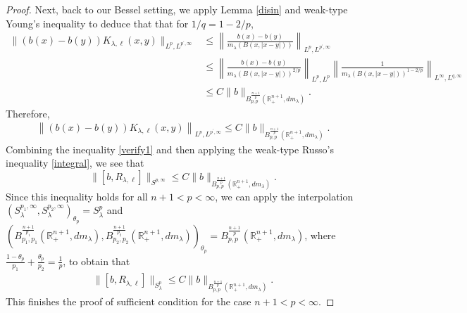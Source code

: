 \documentclass[12pt]{amsart}
\begin{document}
\begin{proof}
Next, back to our Bessel setting, we apply Lemma \ref{disin} and weak-type Young's inequality to deduce that that for $1/q=1-2/p$,
\begin{align*}
\|(b(x)-b(y))K_{\lambda,\ell}(x,y)\|_{L^p,L^{p^{\prime},\infty}}&\leq
\left\|\frac{b(x)-b(y)}{m_\lambda(B(x,|x-y|))}\right\|_{L^p, L^{p^{\prime},\infty}}\nonumber\\
&\leq \left\|\frac{b(x)-b(y)}{m_\lambda(B(x,|x-y|))^{2/p}}\right\|_{L^{p},L^{p}}\left\|\frac{1}{m_\lambda(B(x,|x-y|))^{1-2/p}}\right\|_{L^{\infty},L^{q,\infty}}\nonumber\\
&\leq C\|b\|_{B_{p,p}^{\frac{n+1}{p}}(\mathbb R_+^{n+1},dm_\lambda)}.
\end{align*}
%
%
Therefore,
\begin{align}\label{verify1}
\left\|(b(x)-b(y))K_{\lambda,\ell}(x,y)\right\|_{L^p, L^{p^{\prime},\infty}}\leq C\|b\|_{B_{p,p}^{\frac{n+1}{p}}(\mathbb R_+^{n+1},dm_\lambda)}.
\end{align}
Combining the inequality \eqref{verify1} and then applying the weak-type Russo's inequality \eqref{integral}, we see that $$\|[b,R_{\lambda,\ell}]\|_{S^{p,\infty}}\leq C\|b\|_{B_{p,p}^{\frac{n+1}{p}}(\mathbb R_+^{n+1},dm_\lambda)}.$$ Since this inequality holds for all $n+1<p<\infty$, we can apply the interpolation $(S_\lambda^{p_1,\infty},S_\lambda^{p_2,\infty})_{\theta_p}=S_\lambda^{p}$ and  $(B_{p_1,p_1}^{\frac{n+1}{p_1}}(\mathbb R_+^{n+1},dm_\lambda),B_{p_2,p_2}^{\frac{n+1}{p_2}}(\mathbb R_+^{n+1},dm_\lambda))_{\theta_{p}}=B_{p,p}^{\frac{n+1}{p}}(\mathbb R_+^{n+1},dm_\lambda)$, where $\frac{1-\theta_p}{p_1}+\frac{\theta_p}{p_2}=\frac{1}{p}$, to obtain that
\begin{align*}
\|[b,R_{\lambda,\ell}]\|_{S_\lambda^{p}}\leq C\|b\|_{B_{p,p}^{\frac{n+1}{p}}(\mathbb R_+^{n+1},dm_\lambda)}.
\end{align*}
This finishes the proof of sufficient condition for the case $n+1<p<\infty$.
\end{proof}
\end{document}
